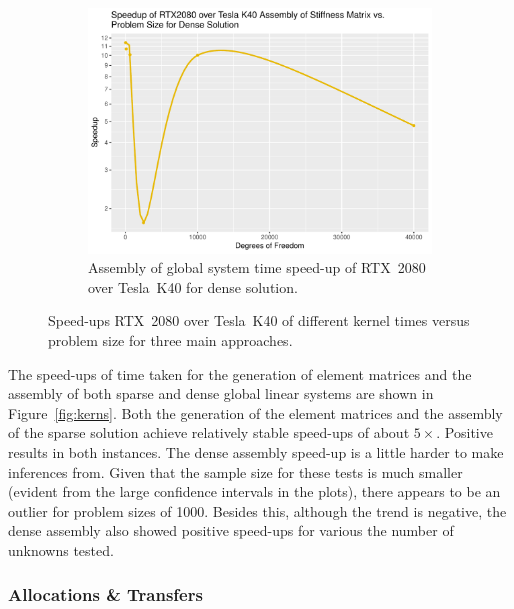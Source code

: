 \begin{figure}
\begin{subfigure}{0.48\linewidth}
		\centering
		\includegraphics[width=\linewidth]{Plots/assem_dense_rtx_speedup_vs_n}
		\caption{Assembly of global system time speed-up of RTX~2080 over Tesla~K40 for dense solution.}
		\label{fig:assem_rtx_dense}
	\end{subfigure}
	\caption{Speed-ups RTX~2080 over Tesla~K40 of different kernel times versus problem size for three main approaches.}
	\label{fig:kerns_rtx}
\end{figure}

The speed-ups of time taken for the generation of element matrices and the assembly of both sparse and dense global linear systems are shown in Figure~\ref{fig:kerns}. Both the generation of the element matrices and the assembly of the sparse solution achieve relatively stable speed-ups of about $5\times$.  Positive results in both instances. The dense assembly speed-up  is a little harder to make inferences from. Given that the sample size for these tests is much smaller (evident from the large confidence intervals in the plots), there appears to be an outlier for problem sizes of 1000. Besides this, although the trend is negative, the dense assembly also showed positive speed-ups for various the number of unknowns tested.

\subsubsection{Allocations \& Transfers}

